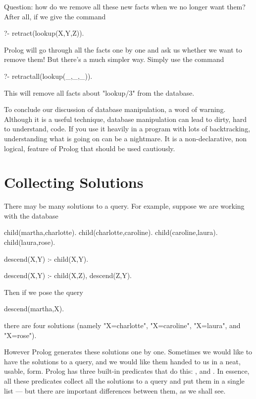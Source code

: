 \medskip


Question: how do we remove all these new facts when we no longer want
them?  After all, if we give the command
\begin{LPNcodedisplay}
?- retract(lookup(X,Y,Z)).
\end{LPNcodedisplay}
Prolog will  go through all the facts one by one and ask us whether we want
to remove them!  But there's a much simpler way. Simply use the command
\begin{LPNcodedisplay}
?- retractall(lookup(_,_,_)).
\end{LPNcodedisplay}
This will remove all facts about "lookup/3" from the database.


To conclude our discussion of database manipulation, a word of
warning.  Although it is a useful technique, database manipulation
can lead to dirty, hard to understand, code.  If you use it heavily in
a program with lots of backtracking, understanding what is going on
can be a nightmare.  It is a non-declarative, non logical, feature of
Prolog that should be used cautiously.



\section{Collecting Solutions}\label{SEC.L11.COLLECTING.SOL}

There may be many solutions to a query. For example,
suppose we are working with the database
\begin{LPNcodedisplay}
child(martha,charlotte).
child(charlotte,caroline).
child(caroline,laura).
child(laura,rose).

descend(X,Y) :- child(X,Y).

descend(X,Y) :- child(X,Z),
                 descend(Z,Y).
\end{LPNcodedisplay}
Then if we pose the query
\begin{LPNcodedisplay}
descend(martha,X).
\end{LPNcodedisplay}
there are four solutions (namely "X=charlotte", "X=caroline",
"X=laura", and "X=rose").

However Prolog generates these solutions one by one.  Sometimes we
would like to have  the solutions to a query, and we
would like them handed to us in a neat, usable, form.  Prolog has
three built-in predicates that do this: ,
 and .  In essence, all these predicates
collect all the solutions to a query and put them in a single list ---
but there are important differences between them, as we shall see.



